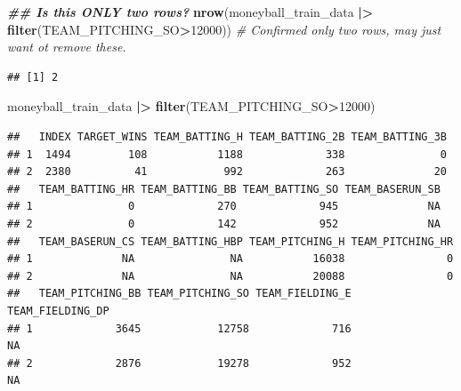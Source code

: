 \documentclass[
]{article}
\newenvironment{Shaded}{\begin{snugshade}}{\end{snugshade}}
\newcommand{\AttributeTok}[1]{\textcolor[rgb]{0.13,0.29,0.53}{#1}}
\newcommand{\CommentTok}[1]{\textcolor[rgb]{0.56,0.35,0.01}{\textit{#1}}}
\newcommand{\DecValTok}[1]{\textcolor[rgb]{0.00,0.00,0.81}{#1}}
\newcommand{\DocumentationTok}[1]{\textcolor[rgb]{0.56,0.35,0.01}{\textbf{\textit{#1}}}}
\newcommand{\FunctionTok}[1]{\textcolor[rgb]{0.13,0.29,0.53}{\textbf{#1}}}
\newcommand{\NormalTok}[1]{#1}
\newcommand{\SpecialCharTok}[1]{\textcolor[rgb]{0.81,0.36,0.00}{\textbf{#1}}}
\newcommand{\StringTok}[1]{\textcolor[rgb]{0.31,0.60,0.02}{#1}}
\begin{document}
\begin{Shaded}
\begin{Highlighting}[]
\DocumentationTok{\#\# Is this ONLY two rows? }
\FunctionTok{nrow}\NormalTok{(moneyball\_train\_data }\SpecialCharTok{|\textgreater{}} \FunctionTok{filter}\NormalTok{(TEAM\_PITCHING\_SO}\SpecialCharTok{\textgreater{}}\DecValTok{12000}\NormalTok{)) }\CommentTok{\# Confirmed only two rows, may just want ot remove these. }
\end{Highlighting}
\end{Shaded}

\begin{verbatim}
## [1] 2
\end{verbatim}

\begin{Shaded}
\begin{Highlighting}[]
\NormalTok{moneyball\_train\_data }\SpecialCharTok{|\textgreater{}} \FunctionTok{filter}\NormalTok{(TEAM\_PITCHING\_SO}\SpecialCharTok{\textgreater{}}\DecValTok{12000}\NormalTok{)}
\end{Highlighting}
\end{Shaded}

\begin{verbatim}
##   INDEX TARGET_WINS TEAM_BATTING_H TEAM_BATTING_2B TEAM_BATTING_3B
## 1  1494         108           1188             338               0
## 2  2380          41            992             263              20
##   TEAM_BATTING_HR TEAM_BATTING_BB TEAM_BATTING_SO TEAM_BASERUN_SB
## 1               0             270             945              NA
## 2               0             142             952              NA
##   TEAM_BASERUN_CS TEAM_BATTING_HBP TEAM_PITCHING_H TEAM_PITCHING_HR
## 1              NA               NA           16038                0
## 2              NA               NA           20088                0
##   TEAM_PITCHING_BB TEAM_PITCHING_SO TEAM_FIELDING_E TEAM_FIELDING_DP
## 1             3645            12758             716               NA
## 2             2876            19278             952               NA
\end{verbatim}

\begin{Shaded}
\end{Shaded}
\end{document}
